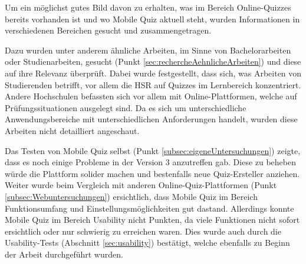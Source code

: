 








Um ein möglichst gutes Bild davon zu erhalten, was im Bereich Online-Quizzes bereits vorhanden ist und wo Mobile Quiz aktuell steht, wurden Informationen in verschiedenen Bereichen gesucht und zusammengetragen.

Dazu wurden unter anderem ähnliche Arbeiten, im Sinne von Bachelorarbeiten oder Studienarbeiten, gesucht (Punkt \ref{sec:rechercheAehnlicheArbeiten}) und diese auf ihre Relevanz überprüft. Dabei wurde festgestellt, dass sich, was Arbeiten von Studierenden betrifft, vor allem die HSR auf Quizzes im Lernbereich konzentriert. Andere Hochschulen befassten sich vor allem mit Online-Plattformen, welche auf Prüfungssituationen ausgelegt sind. Da es sich um unterschiedliche Anwendungsbereiche mit unterschiedlichen Anforderungen handelt, wurden diese Arbeiten nicht detailliert angeschaut.

Das Testen von Mobile Quiz selbst (Punkt \ref{subsec:eigeneUntersuchungen}) zeigte, dass es noch einige Probleme in der Version 3 anzutreffen gab. Diese zu beheben würde die Plattform solider machen und bestenfalls neue Quiz-Ersteller anziehen.
Weiter wurde beim Vergleich mit anderen Online-Quiz-Plattformen (Punkt \ref{subsec:Webuntersuchungen}) ersichtlich, dass Mobile Quiz im Bereich Funktionsumfang und Einstellungsmöglichkeiten gut dastand. Allerdings konnte Mobile Quiz im Bereich Usability nicht Punkten, da viele Funktionen nicht sofort ersichtlich oder nur schwierig zu erreichen waren. Dies wurde auch durch die Usability-Tests (Abschnitt \ref{sec:usability}) bestätigt, welche ebenfalls zu Beginn der Arbeit durchgeführt wurden.

